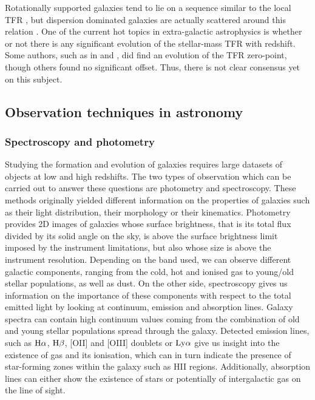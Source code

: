 Rotationally supported galaxies tend to lie on a sequence similar to the local TFR , but dispersion dominated galaxies are actually scattered around this relation . One of the current hot topics in extra-galactic astrophysics is whether or not there is any significant evolution of the stellar-mass TFR with redshift. Some authors, such as in and , did find an evolution of the TFR zero-point, though others found no significant offset. Thus, there is not clear consensus yet on this subject. 


\newpage
\subsection{Observation techniques in astronomy}
\label{subsec:diffPhotSpec}

\subsubsection{Spectroscopy and photometry}
\label{subsubsec:photo_data}

Studying the formation and evolution of galaxies requires large datasets of objects at low and high redshifts. The two types of observation which can be carried out to answer these questions are photometry and spectroscopy. These methods originally yielded different information on the properties of galaxies such as their light distribution, their morphology or their kinematics.
Photometry provides 2D images of galaxies whose surface brightness, that is its total flux divided by its solid angle on the sky, is above the surface brightness limit imposed by the instrument limitations, but also whose size is above the instrument resolution. Depending on the band used, we can observe different galactic components, ranging from the cold, hot and ionised gas to young/old stellar populations, as well as dust.
On the other side, spectroscopy gives us information on the importance of these components with respect to the total emitted light by looking at continuum, emission and absorption lines. Galaxy spectra can contain high continuum values coming from the combination of old and young stellar populations spread through the galaxy. Detected emission lines, such as $\rm{H}{\alpha}$, $\rm{H}{\beta}$, [OII] and [OIII] doublets or $\rm{Ly}\alpha$ give us insight into the existence of gas and its ionisation, which can in turn indicate the presence of star-forming zones within the galaxy such as HII regions. Additionally, absorption lines can either show the existence of stars or potentially of intergalactic gas on the line of sight. \\
      
